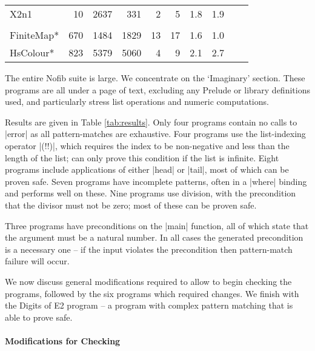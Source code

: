 \begin{table}
\begin{tabular*}{\linewidth}{lrrrrrrlll}
\hspace{-2mm} X2n1                         & 10 & 2637 &  331 & 2 &  5 & 1.8 & 1.9 \\
\vspace{-1ex} \\
\hspace{-2mm} FiniteMap*    \hspace{-3mm} & 670 & 1484 & 1829 & 13 & 17 & 1.6 & 1.0 \\
\hspace{-2mm} HsColour*     \hspace{-3mm} & 823 & 5379 & 5060 & 4 &  9 & 2.1 & 2.7 \\
\hline
\end{tabular*}
\end{table}

The entire Nofib suite \citep{nofib} is large. We concentrate on the `Imaginary' section. These programs are all under a page of text, excluding any Prelude or library definitions used, and particularly stress list operations and numeric computations.

Results are given in Table \ref{tab:results}. Only four programs contain no calls to |error| as all pattern-matches are exhaustive. Four programs use the list-indexing operator |(!!)|, which requires the index to be non-negative and less than the length of the list; \catch{} can only prove this condition if the list is infinite. Eight programs include applications of either |head| or |tail|, most of which can be proven safe. Seven programs have incomplete patterns, often in a |where| binding and \catch{} performs well on these. Nine programs use division, with the precondition that the divisor must not be zero; most of these can be proven safe.

Three programs have preconditions on the |main| function, all of which state that the argument must be a natural number. In all cases the generated precondition is a necessary one -- if the input violates the precondition then pattern-match failure will occur.

We now discuss general modifications required to allow \catch{} to begin checking the programs, followed by the six programs which required changes. We finish with the Digits of E2 program -- a program with complex pattern matching that \catch{} is able to prove safe.

\paragraph{Modifications for Checking}

